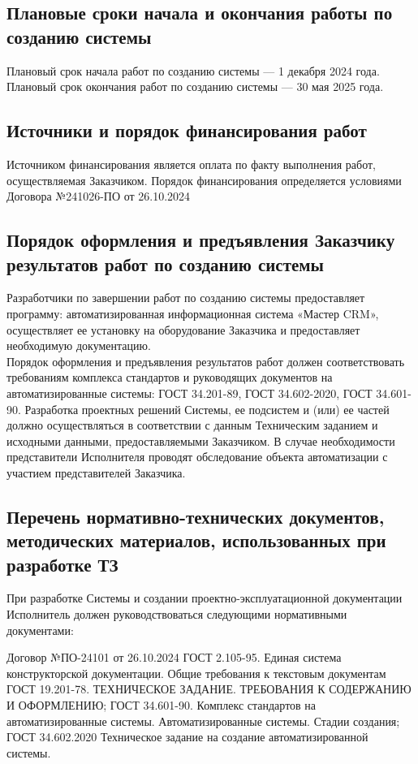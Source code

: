 \documentclass[russian, utf8, 12pt,pointsubsection,floatsubsection]{eskdtext}
\begin{document}
\subsection{Плановые сроки начала и окончания работы по созданию системы}
Плановый срок начала работ по созданию системы --- 1 декабря 2024 года.
Плановый срок окончания работ по созданию системы --- 30 мая 2025 года.

\subsection{Источники и порядок финансирования работ}
Источником финансирования является оплата по факту выполнения работ, осуществляемая Заказчиком.
Порядок финансирования определяется условиями Договора №241026-ПО от 26.10.2024

\subsection{Порядок оформления и предъявления Заказчику результатов работ по созданию системы}
Разработчики по завершении работ по созданию системы предоставляет программу: автоматизированная информационная система «Мастер CRM», осуществляет ее установку на оборудование Заказчика и предоставляет необходимую документацию.\\

Порядок оформления и предъявления результатов работ должен соответствовать требованиям комплекса стандартов и руководящих документов на автоматизированные системы: ГОСТ 34.201-89, ГОСТ 34.602-2020, ГОСТ 34.601-90.
Разработка проектных решений Системы, ее подсистем и (или) ее частей должно осуществляться в соответствии с данным Техническим заданием и исходными данными, предоставляемыми Заказчиком. В случае необходимости представители Исполнителя проводят обследование объекта автоматизации с участием представителей Заказчика.


\subsection{Перечень нормативно-технических документов, методических материалов, использованных при разработке ТЗ}
При разработке Системы и создании проектно-эксплуатационной документации Исполнитель должен руководствоваться следующими нормативными документами:
\begin{enumerate}
Договор №ПО-24101 от 26.10.2024
ГОСТ 2.105-95. Единая система конструкторской документации. Общие требования к текстовым документам
ГОСТ 19.201-78. ТЕХНИЧЕСКОЕ ЗАДАНИЕ. ТРЕБОВАНИЯ К СОДЕРЖАНИЮ И ОФОРМЛЕНИЮ;
ГОСТ 34.601-90. Комплекс стандартов на автоматизированные системы. Автоматизированные системы. Стадии создания;
ГОСТ 34.602.2020 Техническое задание на создание автоматизированной системы.
\end{enumerate}
\end{document}

